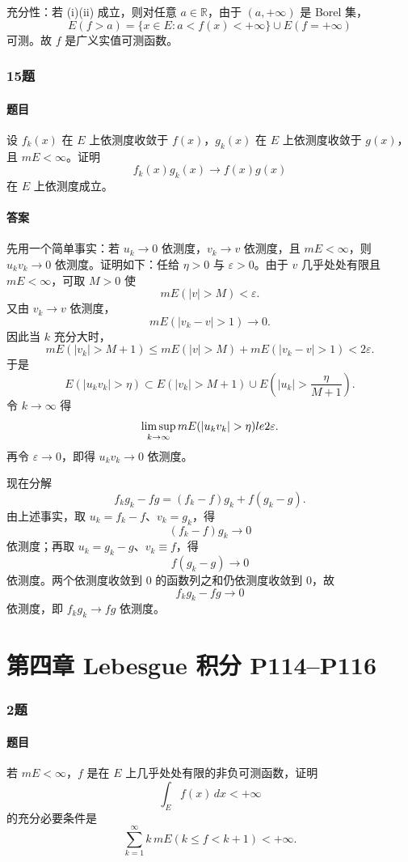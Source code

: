 \documentclass{article}
\newcommand{\eps}{\varepsilon}
\begin{document}
充分性：若 (i)(ii) 成立，则对任意 $a\in\mathbb{R}$，由于 $(a,+\infty)$ 是 Borel 集，
\[
 E(f>a)=\{x\in E:a<f(x)<+\infty\}\cup E(f=+\infty)
\]
可测。故 $f$ 是广义实值可测函数。

\subsubsection*{15题}
\paragraph{题目} 设 $f_k(x)$ 在 $E$ 上依测度收敛于 $f(x)$，$g_k(x)$ 在 $E$ 上依测度收敛于 $g(x)$，且 $mE<\infty$。证明
\[
 f_k(x)g_k(x)\to f(x)g(x)
\]
在 $E$ 上依测度成立。

\paragraph{答案} 先用一个简单事实：若 $u_k\to0$ 依测度，$v_k\to v$ 依测度，且 $mE<\infty$，则 $u_kv_k\to0$ 依测度。证明如下：任给 $\eta>0$ 与 $\eps>0$。由于 $v$ 几乎处处有限且 $mE<\infty$，可取 $M>0$ 使
\[
 mE(|v|>M)<\eps.
\]
又由 $v_k\to v$ 依测度，
\[
 mE(|v_k-v|>1)\to0.
\]
因此当 $k$ 充分大时，
\[
 mE(|v_k|>M+1)
\le mE(|v|>M)+mE(|v_k-v|>1)<2\eps.
\]
于是
\[
 E(|u_kv_k|>\eta)
\subset E(|v_k|>M+1)\cup E\left(|u_k|>\frac{\eta}{M+1}\right).
\]
令 $k\to\infty$ 得
\[
 \limsup_{k\to\infty}mE(|u_kv_k|>\eta)\\le 2\eps.
\]
再令 $\eps\to0$，即得 $u_kv_k\to0$ 依测度。

现在分解
\[
 f_kg_k-fg=(f_k-f)g_k+f(g_k-g).
\]
由上述事实，取 $u_k=f_k-f$、$v_k=g_k$，得
\[
 (f_k-f)g_k\to0
\]
依测度；再取 $u_k=g_k-g$、$v_k\equiv f$，得
\[
 f(g_k-g)\to0
\]
依测度。两个依测度收敛到 $0$ 的函数列之和仍依测度收敛到 $0$，故
\[
 f_kg_k-fg\to0
\]
依测度，即 $f_kg_k\to fg$ 依测度。

\section*{第四章 \quad Lebesgue 积分 \quad P114--P116}

\subsubsection*{2题}
\paragraph{题目} 若 $mE<\infty$，$f$ 是在 $E$ 上几乎处处有限的非负可测函数，证明
\[
 \int_E f(x)\,dx<+\infty
\]
的充分必要条件是
\[
 \sum_{k=1}^{\infty} k\,mE(k\le f<k+1)<+\infty.
\]
\end{document}
